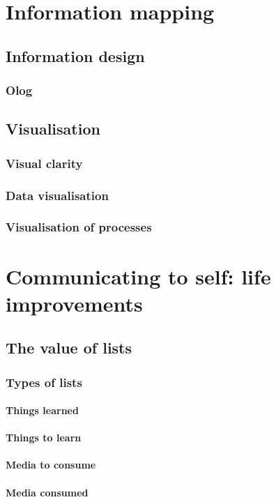 \documentclass{report}
\begin{document}
\part{Information mapping}
\setcounter{chapter}{0} %
\chapter{Information design}
\section{Olog}
\chapter{Visualisation}
\section{Visual clarity}
\section{Data visualisation}
\section{Visualisation of processes}

\part{Communicating to self: life improvements}
\setcounter{chapter}{0} %
\chapter{The value of lists}
\section{Types of lists}
\subsection{Things learned}
\subsection{Things to learn}
\subsection{Media to consume}
\subsection{Media consumed}
\end{document}

